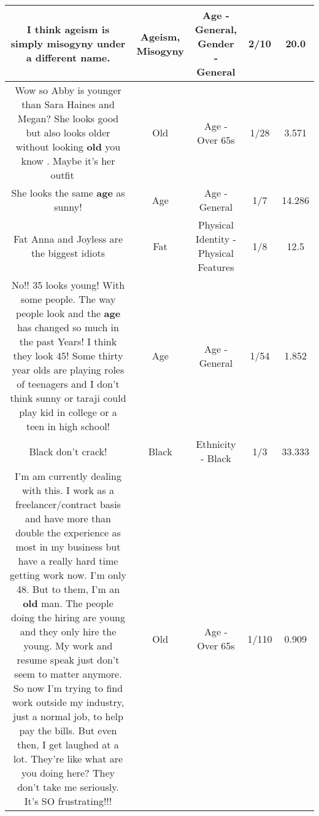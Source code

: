 \documentclass[11pt]{article}
\newlength\mylength
\begin{document}
\begin{center}
\begin{longtable}{|C{.65\mylength}|C{.30\mylength}|C{.12\mylength}|C{.12\mylength}|C{.12\mylength}|}
  \small I think \textbf{ageism} is simply \textbf{misogyny} under a different name.\normalsize   & Ageism, Misogyny & Age - General, Gender - General & 2/10 & 20.0 \\  \hline
  \small Wow so Abby is younger than Sara Haines and Megan? She looks good but also  looks older without looking \textbf{old} you know . Maybe it's her outfit 🤔🤔🤔\normalsize   & Old & Age - Over 65s & 1/28 & 3.571 \\  \hline
  \small She looks the same \textbf{age} as sunny!\normalsize   & Age & Age - General & 1/7 & 14.286 \\  \hline
  \small Fat Anna and Joyless are the biggest idiots\normalsize   & Fat & Physical Identity - Physical Features & 1/8 & 12.5 \\  \hline
  \small No!! 35 looks young! With some people. The way people look and the \textbf{age} has changed so much in the past Years! I think they look 45! Some thirty year olds are playing roles of teenagers and I don't think sunny or taraji could play kid in college or a teen in high school!\normalsize   & Age & Age - General & 1/54 & 1.852 \\  \hline
  \small Black don't crack!\normalsize   & Black & Ethnicity - Black & 1/3 & 33.333 \\  \hline
  \small I'm am currently dealing with this.  I work as a freelancer/contract basis and have more than double the experience as most in my business but have a really hard time getting work now.  I'm only 48.  But to them, I'm an \textbf{old} man.  The people doing the hiring are young and they only hire the young.  My work and resume speak just don't seem to matter anymore.  So now I'm trying to find work outside my industry, just a normal job, to help pay the bills. But even then, I get laughed at a lot.  They're like what are you doing here?  They don't take me seriously.  It's SO frustrating!!!\normalsize   & Old & Age - Over 65s & 1/110 & 0.909 \\  \hline

\end{longtable}
\end{center}
\end{document}
